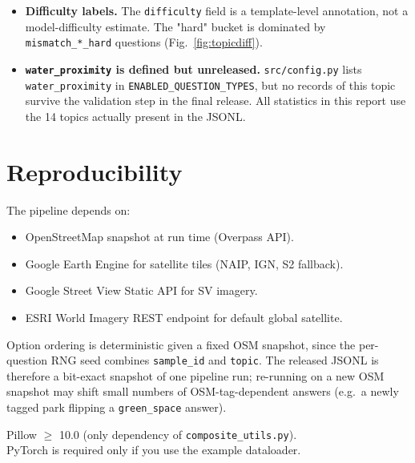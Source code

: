 \documentclass[11pt,a4paper]{article}
\begin{document}
\begin{itemize}[itemsep=3pt]
        in the final release this fallback was not triggered.
  \item \textbf{Difficulty labels.} The \texttt{difficulty} field
        is a template-level annotation, not a model-difficulty
        estimate. The "hard" bucket is dominated by
        \texttt{mismatch\_*\_hard} questions (Fig.~\ref{fig:topicdiff}).
  \item \textbf{\texttt{water\_proximity} is defined but unreleased.}
        \texttt{src/config.py} lists \texttt{water\_proximity} in
        \texttt{ENABLED\_QUESTION\_TYPES}, but no records of this
        topic survive the validation step in the final release. All
        statistics in this report use the 14 topics actually present
        in the JSONL.
\end{itemize}

\section{Reproducibility}

The pipeline depends on:
\begin{itemize}[itemsep=0pt]
  \item OpenStreetMap snapshot at run time (Overpass API).
  \item Google Earth Engine for satellite tiles (NAIP, IGN, S2 fallback).
  \item Google Street View Static API for SV imagery.
  \item ESRI World Imagery REST endpoint for default global satellite.
\end{itemize}

\noindent Option ordering is deterministic given a fixed OSM snapshot,
since the per-question RNG seed combines \texttt{sample\_id} and
\texttt{topic}. The released JSONL is therefore a bit-exact snapshot
of one pipeline run; re-running on a new OSM snapshot may shift
small numbers of OSM-tag-dependent answers (e.g.\ a newly tagged park
flipping a \texttt{green\_space} answer).

\begin{infobox}
Pillow $\geq$ 10.0 (only dependency of \texttt{composite\_utils.py}).\\
PyTorch is required only if you use the example dataloader.
\end{infobox}
\end{document}
